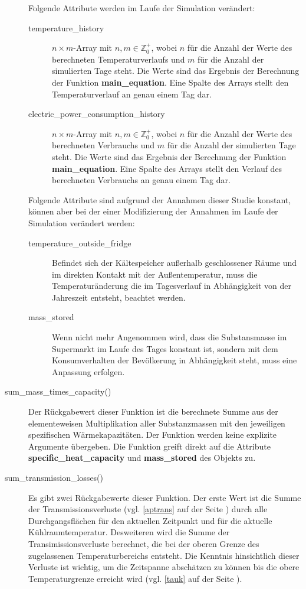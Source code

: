 \begin{description}
	Folgende Attribute werden im Laufe der Simulation ver\"andert:
	\begin{description}
		\item[temperature\_history] $n \times m$-Array mit $n,m\in
		\mathbb{Z}^+_0$, wobei $n$ f\"ur die Anzahl der Werte des
		berechneten Temperaturverlaufs und $m$ f\"ur die Anzahl der
		simulierten Tage steht. Die Werte sind das Ergebnis der
		Berechnung der Funktion \textbf{main\_equation}. Eine Spalte des
		Arrays stellt den Temperaturverlauf an genau einem Tag dar.
		\item[electric\_power\_consumption\_history] $n \times m$-Array
		mit $n,m\in \mathbb{Z}^+_0$, wobei $n$ f\"ur die Anzahl der
		Werte des berechneten Verbrauchs und $m$ f\"ur die Anzahl der
		simulierten Tage steht. Die Werte sind das Ergebnis der
		Berechnung der Funktion \textbf{main\_equation}. Eine Spalte
		des Arrays stellt den Verlauf des berechneten Verbrauchs an
		genau einem Tag dar.
	\end{description}

	Folgende Attribute sind aufgrund der Annahmen dieser Studie konstant,
	k\"onnen aber bei der einer Modifizierung der Annahmen im Laufe der
	Simulation ver\"andert werden:
	\begin{description}
		\item[temperature\_outside\_fridge] Befindet sich der
		K\"altespeicher au\ss erhalb geschlossener R\"aume und im
		direkten Kontakt mit der Au\ss entemperatur, muss die
		Temperatur\"anderung die im Tagesverlauf in Abh\"angigkeit von
		der Jahreszeit entsteht, beachtet werden.
		\item[mass\_stored] Wenn nicht mehr Angenommen wird, dass
		die Substansmasse im Supermarkt im Laufe des Tages konstant ist,
		sondern mit dem Konsumverhalten der Bev\"olkerung in
		Abh\"angigkeit steht, muss eine Anpassung erfolgen.
	\end{description}

	\item[sum\_mass\_times\_capacity()] Der R\"uckgabewert dieser Funktion
	ist die berechnete Summe aus der elementeweisen Multiplikation aller
	Substanzmassen mit den jeweiligen spezifischen W\"armekapazit\"aten. Der
	Funktion werden keine explizite Argumente \"ubergeben. Die Funktion
	greift direkt auf die Attribute \textbf{specific\_heat\_capacity} und
	\textbf{mass\_stored} des Objekts zu.

	\item[sum\_transmission\_losses()] Es gibt zwei R\"uckgabewerte dieser
	Funktion. Der erste Wert ist die Summe der Transmissionsverluste (vgl.
	\cref{aptrans} auf der Seite \pageref{ptrans}) durch alle
	Durchgangsfl\"achen f\"ur den aktuellen Zeitpunkt und f\"ur die aktuelle
	K\"uhlraumtemperatur. Desweiteren wird die Summe der
	Transimissionsverluste berechnet, die bei der oberen Grenze des
	zugelassenen Temperaturbereichs entsteht. Die Kenntnis hinsichtlich
	dieser Verluste ist wichtig, um die Zeitspanne absch\"atzen zu k\"onnen
	bis die obere Temperaturgrenze erreicht wird (vgl. \cref{tauk} auf der
	Seite
	\pageref{tauk}).


\end{description}
